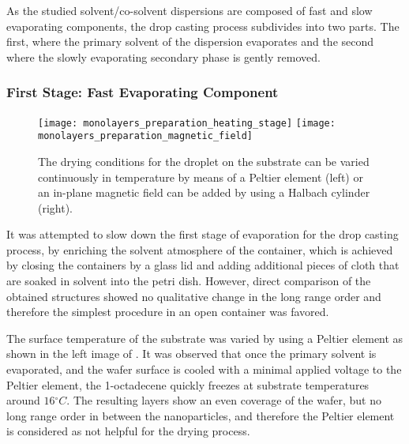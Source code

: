 \documentclass[\main/dresen_thesis.tex]{subfiles}
\begin{document}
  As the studied solvent/co-solvent dispersions are composed of fast and slow evaporating components, the drop casting process subdivides into two parts.
  The first, where the primary solvent of the dispersion evaporates and the second where the slowly evaporating secondary phase is gently removed.

  \subsubsection{First Stage: Fast Evaporating Component}
    \begin{figure}[tb]
      \centering
      \texttt{[image: monolayers\_preparation\_heating\_stage]}
      \texttt{[image: monolayers\_preparation\_magnetic\_field]}
      \caption{\label{fig:monolayers:preparation:dryingConditions:varyConditions}The drying conditions for the droplet on the substrate can be varied continuously in temperature by means of a Peltier element (left) or an in-plane magnetic field can be added by using a Halbach cylinder (right).}
    \end{figure}
    It was attempted to slow down the first stage of evaporation for the drop casting process, by enriching the solvent atmosphere of the container, which is achieved by closing the containers by a glass lid and adding additional pieces of cloth that are soaked in solvent into the petri dish. %
    However, direct comparison of the obtained structures showed no qualitative change in the long range order and therefore the simplest procedure in an open container was favored.

    The surface temperature of the substrate was varied by using a Peltier element as shown in the left image of . %
    It was observed that once the primary solvent is evaporated, and the wafer surface is cooled with a minimal applied voltage to the Peltier element, the 1-octadecene quickly freezes at substrate temperatures around $16 \unit{^\circ C}$.
    The resulting layers show an even coverage of the wafer, but no long range order in between the nanoparticles, and therefore the Peltier element is considered as not helpful for the drying process.
\end{document}
